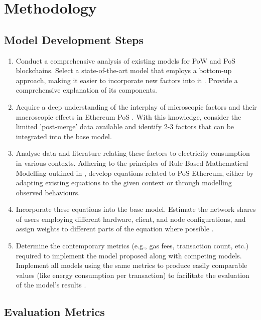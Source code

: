 \chapter {Methodology}

\section{Model Development Steps}
\begin{enumerate}
    \item Conduct a comprehensive analysis of existing models for PoW and PoS blockchains. Select a state-of-the-art model that employs a bottom-up approach, making it easier to incorporate new factors into it \cite{CambridgeCBECI}. Provide a comprehensive explanation of its components.

    \item Acquire a deep understanding of the interplay of microscopic factors and their macroscopic effects in Ethereum PoS \cite{MarionAnModelling}. With this knowledge, consider the limited 'post-merge' data available and identify 2-3 factors that can be integrated into the base model.

    \item Analyse data and literature relating these factors to electricity consumption in various contexts. Adhering to the principles of Rule-Based Mathematical Modelling outlined in , develop equations related to PoS Ethereum, either by adapting existing equations to the given context or through modelling observed behaviours.

    \item Incorporate these equations into the base model. Estimate the network shares of users employing different hardware, client, and node configurations, and assign weights to different parts of the equation where possible \cite{CCRI:Institute}.

    \item Determine the contemporary metrics (e.g., gas fees, transaction count, etc.) required to implement the model proposed along with competing models. Implement all models using the same metrics to produce easily comparable values (like energy consumption per transaction) to facilitate the evaluation of the model's results \cite{CryptoCarbonRatingsInstitute2022TheNetwork}.

\end{enumerate}

\section {Evaluation Metrics}

